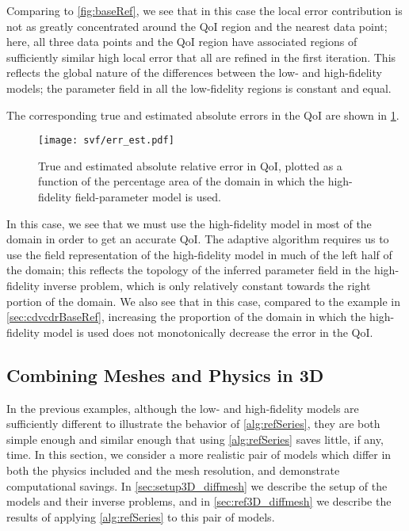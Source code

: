 %
Comparing to \cref{fig:baseRef}, we see that in this case the local error contribution is not as greatly concentrated around the QoI region and the nearest data point; here, all three data points and the QoI region have associated regions of sufficiently similar high local error that all are refined in the first iteration. This reflects the global nature of the differences between the low- and high-fidelity models; the parameter field in all the low-fidelity regions is constant and equal. 

The corresponding true and estimated absolute errors in the QoI are shown in \cref{fig:svfErr}.
%
\begin{figure}[htbp]
\centering
\texttt{[image: svf/err\_est.pdf]}
\caption{True and estimated absolute relative error in QoI, plotted as a function of the percentage area of the domain in which the high-fidelity field-parameter model is used.}
\label{fig:svfErr}
\end{figure}
%
In this case, we see that we must use the high-fidelity model in most of the domain in order to get an accurate QoI. The adaptive algorithm requires us to use the field representation of the high-fidelity model in much of the left half of the domain; this reflects the topology of the inferred parameter field in the high-fidelity inverse problem, which is only relatively constant towards the right portion of the domain. We also see that in this case, compared to the example in \cref{sec:cdvcdrBaseRef}, increasing the proportion of the domain in which the high-fidelity model is used does not monotonically decrease the error in the QoI. 

\subsection{Combining Meshes and Physics in 3D} \label{sec:diffvcdr3D}

In the previous examples, although the low- and high-fidelity models are sufficiently different to illustrate the behavior of \cref{alg:refSeries}, they are both simple enough and similar enough that using \cref{alg:refSeries} saves little, if any, time. In this section, we consider a more realistic pair of models which differ in both the physics included and the mesh resolution, and demonstrate computational savings. In \cref{sec:setup3D_diffmesh} we describe the setup of the models and their inverse problems, and in \cref{sec:ref3D_diffmesh} we describe the results of applying \cref{alg:refSeries} to this pair of models.

